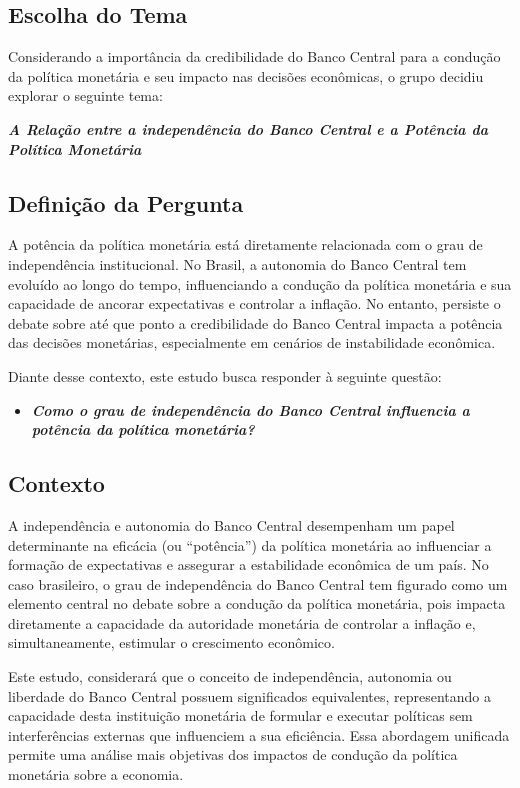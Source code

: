 \documentclass[a4paper,12pt]{article}[abnt2]
\begin{document}
\subsection{\textbf{Escolha do Tema}}

Considerando a importância da credibilidade do Banco Central para a condução da política monetária e seu impacto nas decisões econômicas, o grupo decidiu explorar o seguinte tema:

\textit{\textbf{A Relação entre a independência do Banco Central e a Potência da Política Monetária}}

\subsection{\textbf{Definição da Pergunta}}

A potência da política monetária está diretamente relacionada com o grau de independência institucional. No Brasil, a autonomia do Banco Central tem evoluído ao longo do tempo, influenciando a condução da política monetária e sua capacidade de ancorar expectativas e controlar a inflação. No entanto, persiste o debate sobre até que ponto a credibilidade do Banco Central impacta a potência das decisões monetárias, especialmente em cenários de instabilidade econômica.

Diante desse contexto, este estudo busca responder à seguinte questão:\begin{itemize}
    \item \textit{\textbf{Como o grau de independência do Banco Central influencia a potência da política monetária?}}
\end{itemize}


\subsection{\textbf{Contexto}}  

A independência e autonomia do Banco Central desempenham um papel determinante na eficácia (ou ``potência'') da política monetária ao influenciar a formação de expectativas e assegurar a estabilidade econômica de um país. No caso brasileiro, o grau de independência do Banco Central tem figurado como um elemento central no debate sobre a condução da política monetária, pois impacta diretamente a capacidade da autoridade monetária de controlar a inflação e, simultaneamente, estimular o crescimento econômico.

Este estudo, considerará que o conceito de independência, autonomia ou liberdade do Banco Central possuem significados equivalentes, representando a capacidade desta instituição monetária de formular e executar políticas sem interferências externas que influenciem a sua eficiência. Essa abordagem unificada permite uma análise mais objetivas dos impactos de condução da política monetária sobre a economia.
\end{document}

